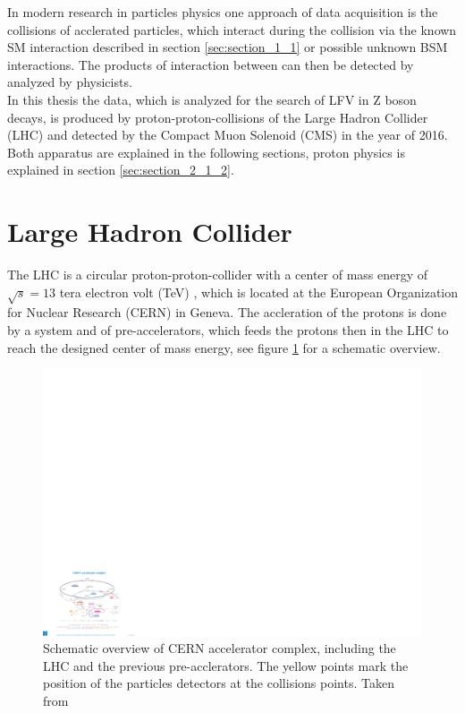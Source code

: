 In modern research in particles physics one approach of data acquisition is the collisions of acclerated particles, which interact during the collision via the known \gls{SM} interaction described in section \ref{sec:section_1_1} or possible unknown \gls{BSM} interactions. The products of interaction between can then be detected by analyzed by physicists. \\

In this thesis the data, which is analyzed for the search of \gls{LFV} in Z boson decays, is produced by proton-proton-collisions of the Large Hadron Collider (\gls{LHC}) \cite{LHC} and detected by the Compact Muon Solenoid (\gls{CMS}) \cite{CMS} in the year of 2016. Both apparatus are explained in the following sections, proton physics is explained in section \ref{sec:section_2_1_2}.


\section{Large Hadron Collider}
\label{sec:section_2_1}

The \gls{LHC} is a circular proton-proton-collider with a center of mass energy of $\sqrt{s} = 13$ tera electron volt (\gls{TeV}) \cite{LHC2}, which is located at the European Organization for Nuclear Research (\gls{CERN}) in Geneva. The accleration of the protons is done by a system and of pre-accelerators, which feeds the protons then in the \gls{LHC} to reach the designed center of mass energy, see figure \ref{fig:fig_2_1} for a schematic overview. \\

\begin{figure}[ht]
	\centering
	\includegraphics[width=1.0\textwidth]{pictures/LHC.pdf}

	\caption[Schematic overview of CERN accelerator complex]{Schematic overview of \gls{CERN} accelerator complex, including the \gls{LHC} and the previous pre-acclerators. The yellow points mark the position of the particles detectors at the collisions points. Taken from \cite{LHCACCL}}
	\label{fig:fig_2_1}
\end{figure}

